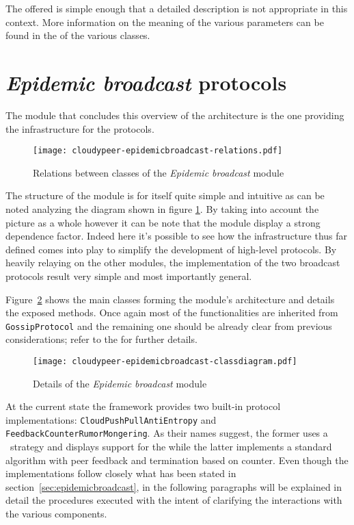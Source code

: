 The offered \api is simple enough that a detailed description is not
appropriate in this context. More information on the meaning of the
various parameters can be found in the \javadoc of the various
classes.

\section{\emph{Epidemic broadcast} protocols}
The module that concludes this overview of the \cloudypeer
architecture is the one providing the infrastructure for the \epidemic
protocols.

\begin{figure}[h!]
  \centering
  \texttt{[image: cloudypeer-epidemicbroadcast-relations.pdf]}
  \caption{Relations between classes of the \textit{Epidemic
      broadcast} module}
  \label{fig:cloudypeer-epidemicbroadcast-relations}
\end{figure}

The structure of the module is for itself quite simple and intuitive as
can be noted analyzing the diagram shown in figure
\ref{fig:cloudypeer-epidemicbroadcast-relations}. By taking into
account the picture as a whole however it can be note that the module
display a strong dependence factor. Indeed here it's possible to see how
the \api infrastructure thus far defined comes into play to simplify
the development of high-level protocols. By heavily relaying on the
other modules, the implementation of the two \epidemic broadcast
protocols result very simple and most importantly general.

Figure~\ref{fig:cloudypeer-epidemicbroadcast-class} shows the main
classes forming the module's architecture and details the exposed
methods. Once again most of the functionalities are inherited from
\texttt{GossipProtocol} and the remaining one should be already clear
from previous considerations; refer to the \javadoc for further details.

\begin{figure}[h]
  \hspace{-50pt}
  \texttt{[image: cloudypeer-epidemicbroadcast-classdiagram.pdf]}
  \caption{Details of the \textit{Epidemic broadcast} module \api}
  \label{fig:cloudypeer-epidemicbroadcast-class}
\end{figure}

At the current state the framework provides two built-in protocol
implementations: \texttt{CloudPushPullAntiEntropy} and
\texttt{FeedbackCounterRumorMongering}. As their names suggest, the
former uses a \PUSHPULL\ strategy and displays support for the \cloud while
the latter implements a standard \rumormongering algorithm with peer
feedback and termination based on counter.
Even though the implementations follow closely what has been stated in
section~\ref{sec:epidemicbroadcast}, in the following paragraphs will be
explained in detail the procedures executed with the intent of
clarifying the interactions with the various \cloudypeer components.

